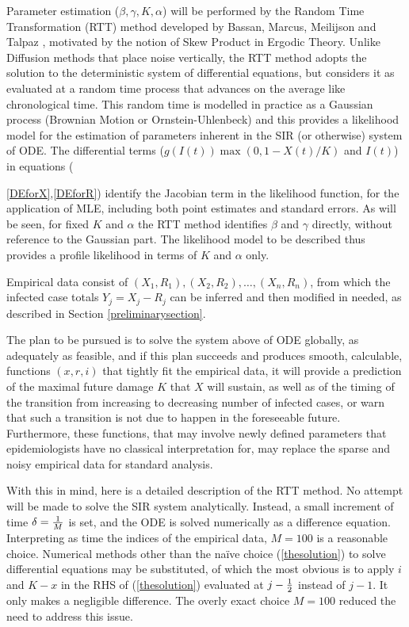 \documentclass{article}
\begin{document}
Parameter estimation ($\beta, \gamma, K, \alpha$) will be performed by the Random Time Transformation (RTT) method developed by Bassan, Marcus, Meilijson and Talpaz \cite{Bassanetal}, motivated by the notion of Skew Product in Ergodic Theory. Unlike Diffusion methods that place noise vertically, the RTT method adopts the solution to the deterministic system of differential equations, but considers it as evaluated at a random time process that advances on the average like chronological time. This random time is modelled in practice as a Gaussian process (Brownian Motion or Ornstein-Uhlenbeck) and this provides a likelihood model for the estimation of parameters inherent in the SIR (or otherwise) system of ODE. The differential terms ($g(I(t)) \max(0,1 - X(t)/K)$ and $I(t)$) in equations ({\ref{DEforX},\ref{DEforR}) identify the Jacobian term in the likelihood function, for the application of MLE, including both point estimates and standard errors. As will be seen, for fixed $K$ and $\alpha$ the RTT method identifies $\beta$ and $\gamma$ directly, without reference to the Gaussian part. The likelihood model to be described thus provides a profile likelihood in terms of $K$ and $\alpha$ only.

\bigskip

Empirical data consist of $(X_1,R_1), (X_2,R_2), \dots, (X_n, R_n)$, from which the infected case totals $Y_j=X_j-R_j$ can be inferred and then modified in needed, as described in Section \ref{preliminarysection}.

The plan to be pursued is to solve the system above of ODE globally, as adequately as feasible, and if this plan succeeds and produces smooth, calculable, functions $(x,r,i)$ that tightly fit the empirical data, it will provide a prediction of the maximal future damage $K$ that $X$ will sustain, as well as of the timing of the transition from increasing to decreasing number of infected cases, or warn that such a transition is not due to happen in the foreseeable future. Furthermore, these functions, that may involve newly defined parameters that epidemiologists have no classical interpretation for, may replace the sparse and noisy empirical data for standard analysis.

With this in mind, here is a detailed description of the RTT method. No attempt will be made to solve the SIR system analytically. Instead, a small increment of time $\delta={1 \over M}$ is set, and the ODE is solved numerically as a difference equation. Interpreting as time the indices of the empirical data, $M=100$ is a reasonable choice. Numerical methods other than the na\"{i}ve choice (\ref{thesolution}) to solve differential equations may be substituted, of which the most obvious is to apply $i$ and $K-x$ in the RHS of (\ref{thesolution}) evaluated at $j-{1 \over 2}$ instead of $j-1$. It only makes a negligible difference. The overly exact choice $M=100$ reduced the need to address this issue.

}
\end{document}
